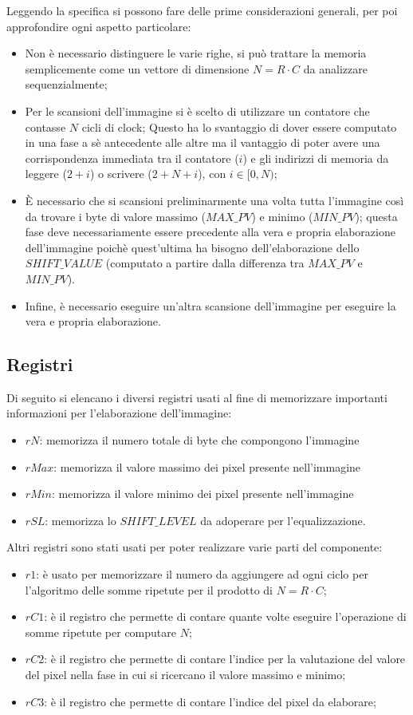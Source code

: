 \documentclass[11pt]{article} %
\begin{document}
Leggendo la specifica si possono fare delle prime considerazioni generali, per poi approfondire ogni aspetto particolare:
\begin{itemize}
\item Non è necessario distinguere le varie righe, si può trattare la memoria semplicemente come un vettore di dimensione $N = R \cdot C$ da analizzare sequenzialmente;
\item Per le scansioni dell'immagine si è scelto di utilizzare un contatore che contasse $N$ cicli di clock; Questo ha lo svantaggio di dover essere computato in una fase a sè antecedente alle altre ma il vantaggio di poter avere una corrispondenza immediata tra il contatore ($i$) e gli indirizzi di memoria da leggere ($2+i$) o scrivere ($2+N+i$), con $i \in [0, N)$;
\item È necessario che si scansioni preliminarmente una volta tutta l'immagine così da trovare i byte di valore massimo ($MAX\_PV$) e minimo ($MIN\_PV$); questa fase deve necessariamente essere precedente alla vera e propria elaborazione dell'immagine poichè quest'ultima ha bisogno dell'elaborazione dello $SHIFT\_VALUE$ (computato a partire dalla differenza tra $MAX\_PV$ e $MIN\_PV$).
\item Infine, è necessario eseguire un'altra scansione dell'immagine per eseguire la vera e propria elaborazione. 
\end{itemize}
 
\subsection{Registri}
Di seguito si elencano i diversi registri usati al fine di memorizzare importanti informazioni per l'elaborazione dell'immagine:
\begin{itemize}
\item $rN$: memorizza il numero totale di byte che compongono l'immagine
\item $rMax$: memorizza il valore massimo dei pixel presente nell'immagine
\item $rMin$: memorizza il valore minimo dei pixel presente nell'immagine	
\item $rSL$: memorizza lo $SHIFT\_LEVEL$ da adoperare per l'equalizzazione.
\end{itemize}
Altri registri sono stati usati per poter realizzare varie parti del componente:
\begin{itemize}
\item $r1$: è usato per memorizzare il numero da aggiungere ad ogni ciclo per l'algoritmo delle somme ripetute per il prodotto di $N = R \cdot C$;
\item $rC1$: è il registro che permette di contare quante volte eseguire l'operazione di somme ripetute per computare $N$;
\item $rC2$: è il registro che permette di contare l'indice per la valutazione del valore del pixel nella fase in cui si ricercano il valore massimo e minimo;
\item $rC3$: è il registro che permette di contare l'indice del pixel da elaborare;
\end{itemize}
\end{document}
